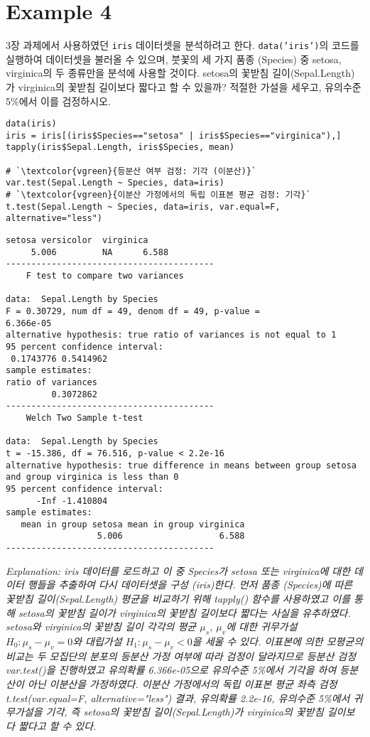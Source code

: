 \documentclass{article}
\begin{document}
\section*{Example 4}
3장 과제에서 사용하였던 \texttt{iris} 데이터셋을 분석하려고 한다. \texttt{data('iris')}의 코드를 실행하여 데이터셋을 불러올 수 있으며, 붓꽃의 세 가지 품종 (Species) 중 setosa, virginica의 두 종류만을
분석에 사용할 것이다. setosa의 꽃받침 길이(Sepal.Length)가 virginica의 꽃받침 길이보다 짧다고 할 수 있을까? 적절한 가설을 세우고, 유의수준 5\%에서 이를 검정하시오.
\begin{lstlisting}[style={r-style}]
data(iris)
iris = iris[(iris$Species=="setosa" | iris$Species=="virginica"),]
tapply(iris$Sepal.Length, iris$Species, mean)

# `\textcolor{vgreen}{등분산 여부 검정: 기각 (이분산)}`
var.test(Sepal.Length ~ Species, data=iris)
# `\textcolor{vgreen}{이분산 가정에서의 독립 이표본 평균 검정: 기각}`
t.test(Sepal.Length ~ Species, data=iris, var.equal=F, alternative="less")
\end{lstlisting}
\begin{lstlisting}[style={out-style}]
    setosa versicolor  virginica 
     5.006         NA      6.588
-----------------------------------------
	F test to compare two variances

data:  Sepal.Length by Species
F = 0.30729, num df = 49, denom df = 49, p-value =
6.366e-05
alternative hypothesis: true ratio of variances is not equal to 1
95 percent confidence interval:
 0.1743776 0.5414962
sample estimates:
ratio of variances 
         0.3072862
-----------------------------------------
	Welch Two Sample t-test

data:  Sepal.Length by Species
t = -15.386, df = 76.516, p-value < 2.2e-16
alternative hypothesis: true difference in means between group setosa and group virginica is less than 0
95 percent confidence interval:
      -Inf -1.410804
sample estimates:
   mean in group setosa mean in group virginica 
                  5.006                   6.588 
-----------------------------------------
\end{lstlisting}
\emph{Explanation: iris 데이터를 로드하고 이 중 Species가 setosa 또는 virginica에 대한 데이터 행들을 추출하여 다시 데이터셋을 구성 (iris)한다. 먼저 품종 (Species)에 따른 꽃받침 길이(Sepal.Length) 평균을 비교하기 위해 tapply() 함수를 사용하였고 이를 통해 setosa의 꽃받침 길이가 virginica의 꽃받침 길이보다 짧다는 사실을 유추하였다.\\
setosa와 virginica의 꽃받침 길이 각각의 평균 $\mu_s$, $\mu_v$에 대한 귀무가설 $H_0: \mu_s-\mu_v=0$와 대립가설 $H_1: \mu_s-\mu_v < 0$을 세울 수 있다. 이표본에 의한 모평균의 비교는 두 모집단의 분포의 등분산 가정 여부에 따라 검정이 달라지므로 등분산 검정 var.test()을 진행하였고 유의확률 6.366e-05으로 유의수준 5\%에서 기각을 하여 등분산이 아닌 이분산을 가정하였다. 이분산 가정에서의 독립 이표본 평균 좌측 검정 t.test(var.equal=F, alternative="less") 결과, 유의확률 2.2e-16, 유의수준 5\%에서 귀무가설을 기각, 즉 setosa의 꽃받침 길이(Sepal.Length)가 virginica의 꽃받침 길이보다 짧다고 할 수 있다. } \\
\end{document}
